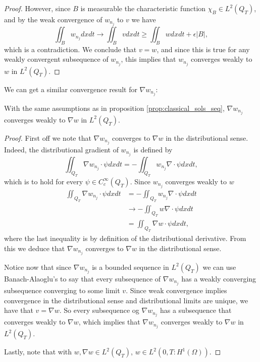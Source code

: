 \documentclass[11pt, a4paper]{article}
\begin{document}
\begin{proof}
	However, since $B$ is measurable the characteristic function $\chi_B \in L^2(Q_T)$, and by the weak convergence of $w_{n_j}$ to $v$ we have
	\begin{equation*}
	\iint_B w_{n_j}dxdt \to \iint_B vdxdt \geq \iint_B wdxdt + \epsilon|B|,
	\end{equation*}
	which is a contradiction. We conclude that $v=w$, and since this is true for any weakly convergent subsequence of $w_{n_j}$, this implies that $w_{n_j}$ converges weakly to $w$ in $L^2(Q_T)$.
\end{proof}

We can get a similar convergence result for $\nabla w_{n_j}$:
\begin{lemma}
\label{prop:gradw_weak_convergence}
With the same assumptions as in proposition \ref{prop:classical_sols_seq},
$\nabla w_{n_j}$ converges weakly to $\nabla w$ in $L^2(Q_T)$.
\end{lemma}
\begin{proof}
First off we note that $\nabla w_{n_j}$ converges to $\nabla w$ in the distributional sense. Indeed, the distributional gradient of $w_{n_j}$ is defined by
	\begin{equation}
	\iint_{Q_T}\nabla w_{n_j}\cdot \psi dxdt = -\iint_{Q_T} w_{n_j} \nabla \cdot \psi dxdt ,
	\end{equation}
	which is to hold for every $\psi \in C^\infty_c(Q_T)$. Since $w_{n_j}$ converges weakly to $w$
	\begin{align*}
	\iint_{Q_T}\nabla w_{n_j} \cdot \psi dxdt &= -\iint_{Q_T} w_{n_j} \nabla \cdot \psi dxdt \\
	&\to -\iint_{Q_T} w \nabla \cdot \psi dxdt \\
	&= \iint_{Q_T} \nabla w \cdot \psi dxdt,
	\end{align*}
	where the last inequality is by definition of the distributional derivative. From this we deduce that $\nabla w_{n_j}$ converges to $\nabla w$ in the distributional sense.
	
	Notice now that since $\nabla w_{n_j}$ is a bounded sequence in $L^2(Q_T)$ we can use Banach-Alaoglu's to say that every subsequence of $\nabla w_{n_j}$ has a weakly converging subsequence converging to some limit $v$. Since weak convergence implies convergence in the distributional sense and distributional limits are unique, we have that $v=\nabla w$. So every subsequence og $\nabla w_{n_j}$ has a subsequence that converges weakly to $\nabla w$, which implies that $\nabla w_{n_j}$ converges weakly to $\nabla w$ in $L^2(Q_T)$.
	
		
	 Lastly, note that with $w, \nabla w \in L^2(Q_T)$, $w \in L^2(0,T: H^1(\Omega))$.
\end{proof}
\end{document}
